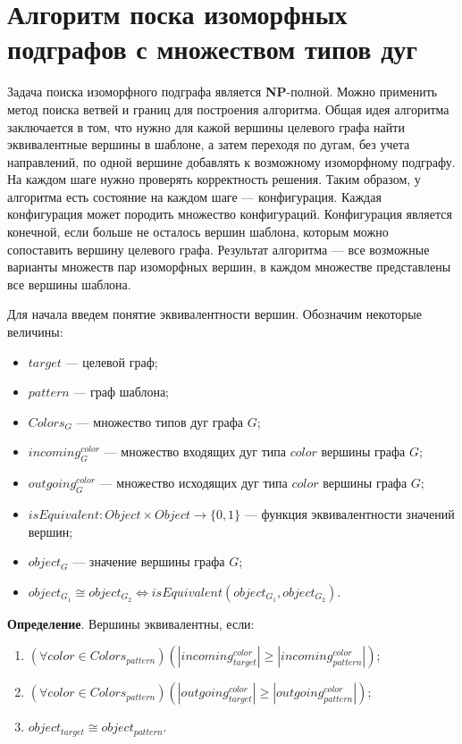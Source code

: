 \section{Алгоритм поска изоморфных подграфов с множеством типов дуг}

Задача поиска изоморфного подграфа является \textbf{NP}-полной.
Можно применить метод поиска ветвей и границ для построения алгоритма.
Общая идея алгоритма заключается в том,
что нужно для кажой вершины целевого графа найти эквивалентные вершины в шаблоне,
а затем переходя по дугам, без учета направлений,
по одной вершине добавлять к возможному изоморфному подграфу.
На каждом шаге нужно проверять корректность решения.
Таким образом, у алгоритма есть состояние на каждом шаге --- конфигурация.
Каждая конфигурация может породить множество конфигураций.
Конфигурация является конечной, если больше не осталось вершин шаблона,
которым можно сопоставить вершину целевого графа.
Результат алгоритма --- все возможные варианты множеств пар изоморфных вершин,
в каждом множестве представлены все вершины шаблона.

Для начала введем понятие эквивалентности вершин.
Обозначим некоторые величины:
\begin{itemize}
\item $target$ --- целевой граф;
\item $pattern$ --- граф шаблона;
\item $Colors_G$ --- множество типов дуг графа $G$;
\item $incoming^{color}_G$ --- множество входящих дуг типа $color$ вершины графа $G$;
\item $outgoing^{color}_G$ --- множество исходящих дуг типа $color$ вершины графа $G$;
\item $isEquivalent: Object \times Object \to \{ 0, 1 \}$ --- функция эквивалентности значений вершин;
\item $object_G$ --- значение вершины графа $G$;
\item $object_{G_1} \cong object_{G_2} \iff isEquivalent(object_{G_1}, object_{G_2})$.
\end{itemize}

\textbf{Определение}. Вершины эквивалентны, если:
\begin{enumerate}
\item $( \forall color \in Colors_{pattern} ) ( |incoming^{color}_{target}| \ge |incoming^{color}_{pattern}| )$;
\item $( \forall color \in Colors_{pattern} ) ( |outgoing^{color}_{target}| \ge |outgoing^{color}_{pattern}| )$;
\item $object_{target} \cong object_{pattern}$.
\end{enumerate}

